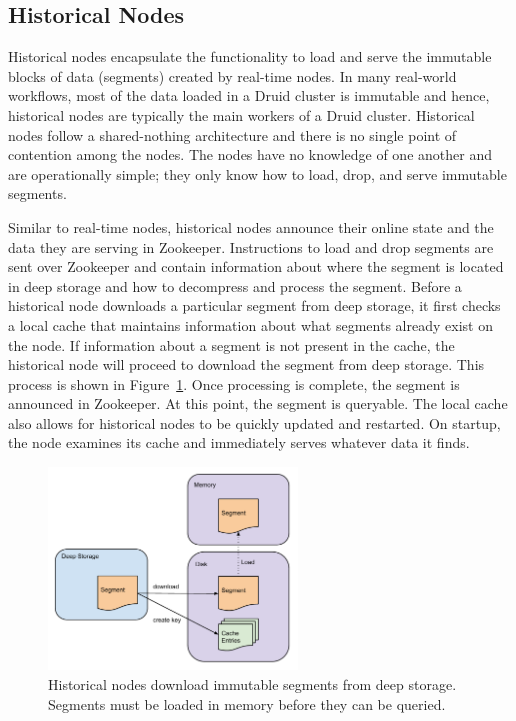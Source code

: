 \documentclass{sig-alternate-2013}
\begin{document}
\subsection{Historical Nodes}
Historical nodes encapsulate the functionality to load and serve the immutable
blocks of data (segments) created by real-time nodes. In many real-world
workflows, most of the data loaded in a Druid cluster is immutable and hence,
historical nodes are typically the main workers of a Druid cluster.  Historical
nodes follow a shared-nothing architecture and there is no single point of
contention among the nodes. The nodes have no knowledge of one another and are
operationally simple; they only know how to load, drop, and serve immutable
segments. 

Similar to real-time nodes, historical nodes announce their online state and
the data they are serving in Zookeeper. Instructions to load and drop segments
are sent over Zookeeper and contain information about where the segment is
located in deep storage and how to decompress and process the segment.  Before
a historical node downloads a particular segment from deep storage, it first
checks a local cache that maintains information about what segments already
exist on the node.  If information about a segment is not present in the cache,
the historical node will proceed to download the segment from deep storage.
This process is shown in Figure~\ref{fig:historical_download}. Once processing
is complete, the segment is announced in Zookeeper.  At this point, the segment
is queryable. The local cache also allows for historical nodes to be quickly
updated and restarted. On startup, the node examines its cache and immediately
serves whatever data it finds.

\begin{figure}
\centering
\includegraphics[width = 2.6in]{historical_download}
\caption{Historical nodes download immutable segments from deep storage. Segments must be loaded in memory before they can be queried.}
\label{fig:historical_download}
\end{figure}
\end{document}
